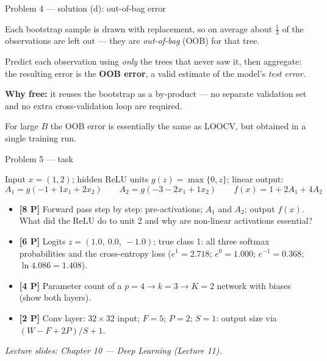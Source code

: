 \documentclass[aspectratio=169,11pt]{beamer}
\begin{document}
\begin{frame}{Problem 4 --- solution (d): out-of-bag error}
  \begin{solutionbox}
    Each bootstrap sample is drawn with replacement, so on average about $\tfrac13$ of the
    observations are left out --- they are \emph{out-of-bag} (OOB) for that tree.
    \medskip

    Predict each observation using \emph{only} the trees that never saw it, then aggregate: the
    resulting error is the \textbf{OOB error}, a valid estimate of the model's \emph{test error}.
    \medskip

    \textbf{Why free:} it reuses the bootstrap as a by-product --- no separate validation set and
    no extra cross-validation loop are required.
  \end{solutionbox}
  \begin{takeaway}
    \footnotesize For large $B$ the OOB error is essentially the same as LOOCV, but obtained in a
    single training run.
  \end{takeaway}
\end{frame}

\begin{frame}{Problem 5 --- task}
  \begin{exercise}
    Input $x=(1{,}2)$; hidden ReLU units $g(z)=\max\{0{,}z\}$; linear output:
    \[
      A_1=g(-1+1x_1+2x_2)\qquad A_2=g(-3-2x_1+1x_2)\qquad f(x)=1+2A_1+4A_2
    \]
    \begin{itemize}
      \item[(a)] \textbf{[8 P]} Forward pass step by step: pre-activations; $A_1$ and $A_2$;
        output $f(x)$. What did the ReLU do to unit 2 and why are non-linear activations essential?
      \item[(b)] \textbf{[6 P]} Logits $z=(1.0{,}\ 0.0{,}\ -1.0)$; true class 1: all three softmax
        probabilities and the cross-entropy loss
        ($e^{1}=2.718$; $e^{0}=1.000$; $e^{-1}=0.368$; $\ln 4.086=1.408$).
      \item[(c)] \textbf{[4 P]} Parameter count of a $p=4\to k=3\to K=2$ network with biases
        (show both layers).
      \item[(d)] \textbf{[2 P]} Conv layer: $32\times 32$ input; $F=5$; $P=2$; $S=1$:
        output size via $(W-F+2P)/S+1$.
    \end{itemize}
  \end{exercise}
  {\scriptsize\itshape Lecture slides: Chapter 10 --- Deep Learning (Lecture 11).}
\end{frame}
\end{document}
